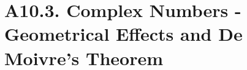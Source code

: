 \chapter{A10.3. Complex Numbers - Geometrical Effects and De Moivre's Theorem}


\clearpage

\clearpage
